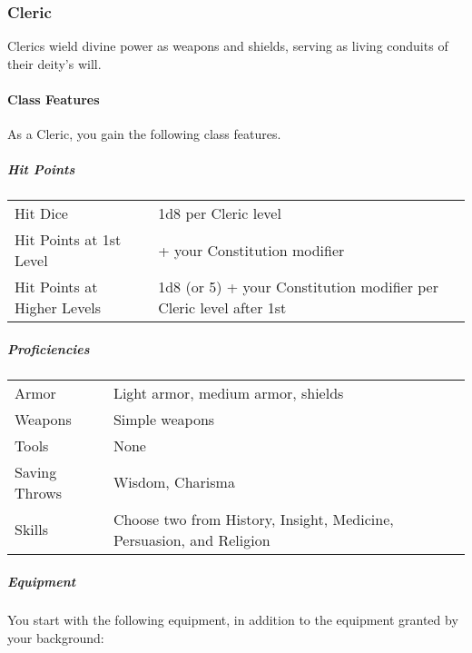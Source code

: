 \subsubsection{Cleric}\label{cleric-class}

Clerics wield divine power as weapons and shields, serving as living
conduits of their deity's will.

\paragraph{Class Features}\label{_class_features}

As a Cleric, you gain the following class features.

\subparagraph{Hit Points}\label{_hit_points}

\begin{longtable}[]{@{}
  >{\raggedright\arraybackslash}p{}
  >{\raggedright\arraybackslash}p{}@{}}
\toprule\noalign{}
\endhead
\bottomrule\noalign{}
\endlastfoot
Hit Dice & 1d8 per Cleric level \\
Hit Points at 1st Level & 8 + your Constitution modifier \\
Hit Points at Higher Levels & 1d8 (or 5) + your Constitution modifier
per Cleric level after 1st \\
\end{longtable}

\subparagraph{Proficiencies}\label{_proficiencies}

\begin{longtable}[]{@{}
  >{\raggedright\arraybackslash}p{}
  >{\raggedright\arraybackslash}p{}@{}}
\toprule\noalign{}
\endhead
\bottomrule\noalign{}
\endlastfoot
Armor & Light armor, medium armor, shields \\
Weapons & Simple weapons \\
Tools & None \\
Saving Throws & Wisdom, Charisma \\
Skills & Choose two from History, Insight, Medicine, Persuasion, and
Religion \\
\end{longtable}

\subparagraph{Equipment}\label{_equipment}

You start with the following equipment, in addition to the equipment
granted by your background:

